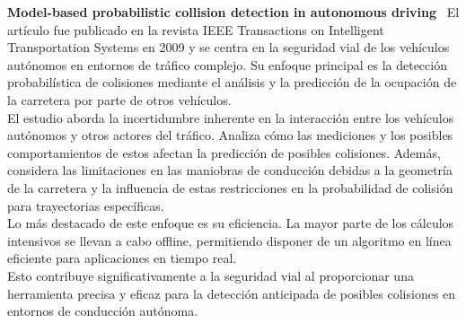 \textbf{Model-based probabilistic collision detection in autonomous driving}~\cite{althoff2009model}
El artículo fue publicado en la revista IEEE Transactions on Intelligent Transportation Systems en 2009 y se centra en la seguridad vial
de los vehículos autónomos en entornos de tráfico complejo.
Su enfoque principal es la detección probabilística de colisiones mediante el análisis y la predicción de la ocupación de la carretera
por parte de otros vehículos.\\
El estudio aborda la incertidumbre inherente en la interacción entre los vehículos autónomos y otros actores del tráfico.
Analiza cómo las mediciones y los posibles comportamientos de estos afectan la predicción de posibles colisiones.
Además, considera las limitaciones en las maniobras de conducción debidas a la geometría de la carretera y la influencia
de estas restricciones en la probabilidad de colisión para trayectorias específicas.\\
Lo más destacado de este enfoque es su eficiencia. La mayor parte de los cálculos intensivos se llevan a cabo offline,
permitiendo disponer de un algoritmo en línea eficiente para aplicaciones en tiempo real.                                                                           \\
Esto contribuye significativamente a la seguridad vial al proporcionar una herramienta precisa y eficaz para la detección anticipada de
posibles colisiones en entornos de conducción autónoma.                                                            \\
